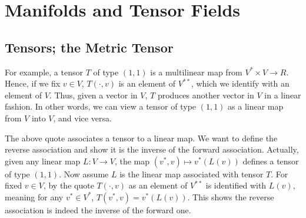 \documentclass{note}
\numberwithin{equation}{chapter}
\begin{document}
\chapter{Manifolds and Tensor Fields}

\setcounter{section}{2}
\section{Tensors; the Metric Tensor}


\begin{quotebar}
    For example, a tensor $T$ of type $(1,1)$ is a multilinear map from $V^*
        \times V \to R$. Hence, if we fix $v \in V$, $T(\cdot,v)$ is an element
    of $V^{**}$, which we identify with an element of $V$. Thus, given a vector
    in $V$, $T$ produces another vector in $V$ in a linear fashion. In other
    words, we can view a tensor of type $(1,1)$ as a linear map from $V$ into
    $V$, and vice versa.
\end{quotebar}

The above quote associates a tensor to a linear map. We want to define the
reverse association and show it is the inverse of the forward association.
Actually, given any linear map $L\colon V \to V$, the map $(v^*, v) \mapsto
    v^*(L(v))$ defines a tensor of type $(1,1)$. Now assume $L$ is the linear map
associated with tensor $T$. For fixed $v \in V$, by the quote $T(\cdot,v)$ as
an element of $V^{**}$ is identified with $L(v)$, meaning for any $v^* \in
    V^*$, $T(v^*,v) = v^*(L(v))$. This shows the reverse association is indeed the
inverse of the forward one.
\end{document}
